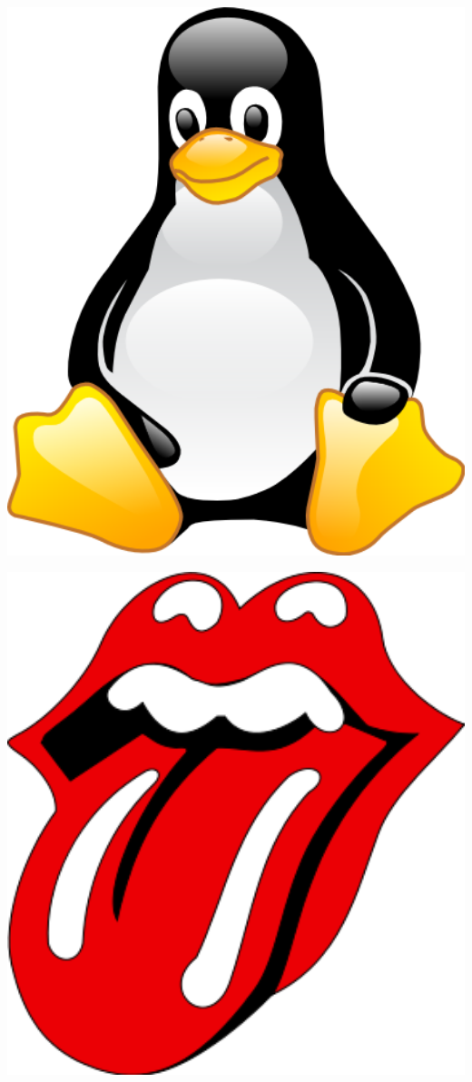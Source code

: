 \includegraphics[width=1\textwidth]{figures/1.png}

\includegraphics[width=1\textwidth]{figures/2.png}

